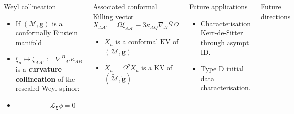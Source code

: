 \documentclass[10pt]{beamer}
\theoremstyle{plain}
\def\bmg{{\bm g}}
\begin{document}
\begin{frame}
  \begin{columns}
    \column{6.0cm}
    \vspace{-4mm}
    \begin{exampleblock}{Weyl collineation}
      \begin{itemize}
       \item  If $(\mathcal{M},\bmg)$ is a conformally Einstein manifold
       \item $\xi_{a} \mapsto \xi_{AA'}:= \nabla^{B}{}_{A'}\kappa_{AB}$ is a
         \textbf{curvature collineation} of the rescaled Weyl spinor:
      \item $\qquad \qquad \quad \mathcal{L}_{\bm\xi}\phi=0$
      \end{itemize}
    \end{exampleblock}
    \vspace{-3mm}
    \begin{block}{Associated conformal Killing vector}
      \vspace{-3mm}
      \begin{equation*}\label{eq:conformalKillingVector}
  X_{AA'}=\Omega \xi_{AA'} - 3 \kappa_{AQ}\nabla_{A'}{}^{Q}\Omega
      \end{equation*}
      \vspace{-5mm}
      \begin{itemize}
\item $X_a$ is a conformal KV of $(\mathcal{M},\bmg)$
\item $\tilde{X}_a=\Omega^{2}X_{a}$ is a KV of $(\tilde{\mathcal{M}},\tilde{\bmg})$
      \end{itemize}
      \pause
    \end{block}
    \begin{exampleblock}{Future applications}
      \begin{itemize}
    \item  Characterisation Kerr-de-Sitter through asympt ID.
    \item  Type D initial data characterisation.
      \end{itemize}
     \end{exampleblock}
    \column{4cm}
     \begin{block}{Future directions}
       \begin{itemize}
         

\end{itemize}
\end{block}
\end{columns}
\end{frame}
\end{document}
